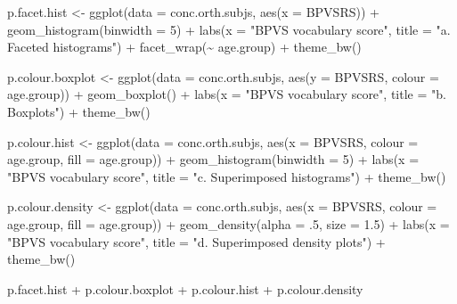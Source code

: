 \documentclass[
  letterpaper,
  DIV=11,
  numbers=noendperiod]{scrreprt}
\newenvironment{Shaded}{\begin{snugshade}}{\end{snugshade}}
\newcommand{\AttributeTok}[1]{\textcolor[rgb]{0.40,0.45,0.13}{#1}}
\newcommand{\DecValTok}[1]{\textcolor[rgb]{0.68,0.00,0.00}{#1}}
\newcommand{\FloatTok}[1]{\textcolor[rgb]{0.68,0.00,0.00}{#1}}
\newcommand{\FunctionTok}[1]{\textcolor[rgb]{0.28,0.35,0.67}{#1}}
\newcommand{\NormalTok}[1]{\textcolor[rgb]{0.00,0.23,0.31}{#1}}
\newcommand{\OtherTok}[1]{\textcolor[rgb]{0.00,0.23,0.31}{#1}}
\newcommand{\SpecialCharTok}[1]{\textcolor[rgb]{0.37,0.37,0.37}{#1}}
\newcommand{\StringTok}[1]{\textcolor[rgb]{0.13,0.47,0.30}{#1}}
\begin{document}
\begin{Shaded}
\begin{Highlighting}[]
\NormalTok{p.facet.hist }\OtherTok{\textless{}{-}} \FunctionTok{ggplot}\NormalTok{(}\AttributeTok{data =}\NormalTok{ conc.orth.subjs, }\FunctionTok{aes}\NormalTok{(}\AttributeTok{x =}\NormalTok{ BPVSRS)) }\SpecialCharTok{+}
  \FunctionTok{geom\_histogram}\NormalTok{(}\AttributeTok{binwidth =} \DecValTok{5}\NormalTok{) }\SpecialCharTok{+}
  \FunctionTok{labs}\NormalTok{(}\AttributeTok{x =} \StringTok{"BPVS vocabulary score"}\NormalTok{, }\AttributeTok{title =} \StringTok{"a. Faceted histograms"}\NormalTok{) }\SpecialCharTok{+}
  \FunctionTok{facet\_wrap}\NormalTok{(}\SpecialCharTok{\textasciitilde{}}\NormalTok{ age.group) }\SpecialCharTok{+}
  \FunctionTok{theme\_bw}\NormalTok{()}

\NormalTok{p.colour.boxplot }\OtherTok{\textless{}{-}} \FunctionTok{ggplot}\NormalTok{(}\AttributeTok{data =}\NormalTok{ conc.orth.subjs, }\FunctionTok{aes}\NormalTok{(}\AttributeTok{y =}\NormalTok{ BPVSRS, }\AttributeTok{colour =}\NormalTok{ age.group)) }\SpecialCharTok{+}
  \FunctionTok{geom\_boxplot}\NormalTok{() }\SpecialCharTok{+}
  \FunctionTok{labs}\NormalTok{(}\AttributeTok{x =} \StringTok{"BPVS vocabulary score"}\NormalTok{, }\AttributeTok{title =} \StringTok{"b. Boxplots"}\NormalTok{) }\SpecialCharTok{+}
  \FunctionTok{theme\_bw}\NormalTok{()}

\NormalTok{p.colour.hist }\OtherTok{\textless{}{-}} \FunctionTok{ggplot}\NormalTok{(}\AttributeTok{data =}\NormalTok{ conc.orth.subjs, }\FunctionTok{aes}\NormalTok{(}\AttributeTok{x =}\NormalTok{ BPVSRS, }\AttributeTok{colour =}\NormalTok{ age.group, }\AttributeTok{fill =}\NormalTok{ age.group)) }\SpecialCharTok{+}
  \FunctionTok{geom\_histogram}\NormalTok{(}\AttributeTok{binwidth =} \DecValTok{5}\NormalTok{) }\SpecialCharTok{+}
  \FunctionTok{labs}\NormalTok{(}\AttributeTok{x =} \StringTok{"BPVS vocabulary score"}\NormalTok{, }\AttributeTok{title =} \StringTok{"c. Superimposed histograms"}\NormalTok{) }\SpecialCharTok{+}
  \FunctionTok{theme\_bw}\NormalTok{()}

\NormalTok{p.colour.density }\OtherTok{\textless{}{-}} \FunctionTok{ggplot}\NormalTok{(}\AttributeTok{data =}\NormalTok{ conc.orth.subjs, }\FunctionTok{aes}\NormalTok{(}\AttributeTok{x =}\NormalTok{ BPVSRS, }\AttributeTok{colour =}\NormalTok{ age.group, }\AttributeTok{fill =}\NormalTok{ age.group)) }\SpecialCharTok{+}
  \FunctionTok{geom\_density}\NormalTok{(}\AttributeTok{alpha =}\NormalTok{ .}\DecValTok{5}\NormalTok{, }\AttributeTok{size =} \FloatTok{1.5}\NormalTok{) }\SpecialCharTok{+}
  \FunctionTok{labs}\NormalTok{(}\AttributeTok{x =} \StringTok{"BPVS vocabulary score"}\NormalTok{, }\AttributeTok{title =} \StringTok{"d. Superimposed density plots"}\NormalTok{) }\SpecialCharTok{+}
  \FunctionTok{theme\_bw}\NormalTok{()}

\NormalTok{p.facet.hist }\SpecialCharTok{+}\NormalTok{ p.colour.boxplot }\SpecialCharTok{+}\NormalTok{ p.colour.hist }\SpecialCharTok{+}\NormalTok{ p.colour.density}
\end{Highlighting}
\end{Shaded}
\end{document}
